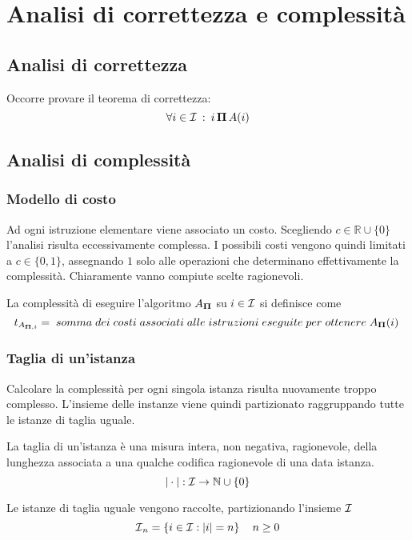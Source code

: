 \section{Analisi di correttezza e complessità}

\subsection{Analisi di correttezza}

Occorre provare il teorema di correttezza:
$$ \forall i \in \mathcal{I}{} \: : \: i \, \bm{\Pi}{} \, A(i) $$

\subsection{Analisi di complessità}

\subsubsection{Modello di costo}
Ad ogni istruzione elementare viene associato un costo. Scegliendo $c \in \mathbb{R} \cup \{ 0 \} $ l'analisi risulta eccessivamente complessa. I possibili costi vengono quindi limitati a $c \in \{ 0,1 \} $, assegnando $1$ solo alle operazioni che determinano effettivamente la complessità. Chiaramente vanno compiute scelte ragionevoli.

La complessità di eseguire l'algoritmo $A_{\bm{\Pi}{}}$ su $i \in \mathcal{I}{}$ si definisce come
$$t_{A_{\bm{\Pi}{},i}}=\;somma\;dei\;costi\;associati\;alle\;istruzioni\;eseguite\;per\;ottenere\;A_{\bm{\Pi}{}}(i)\;$$

\subsubsection{Taglia di un'istanza}
Calcolare la complessità per ogni singola istanza risulta nuovamente troppo complesso. L'insieme delle instanze viene quindi partizionato raggruppando tutte le istanze di taglia uguale.

\begin{definition}\label{def:taglia}
    La taglia di un'istanza è una misura intera, non negativa, ragionevole, della lunghezza associata a una qualche codifica ragionevole di una data istanza.\\
    $$|\cdot|:\mathcal{I}{}\to \mathbb{N} \cup \{0\}$$
\end{definition}

Le istanze di taglia uguale vengono raccolte, partizionando l'insieme $\mathcal{I}{}$
$$ \mathcal{I}{}_{n} = \left\{ i \in \mathcal{I}{} : |i|=n \right\} \quad n \geq 0$$ 

